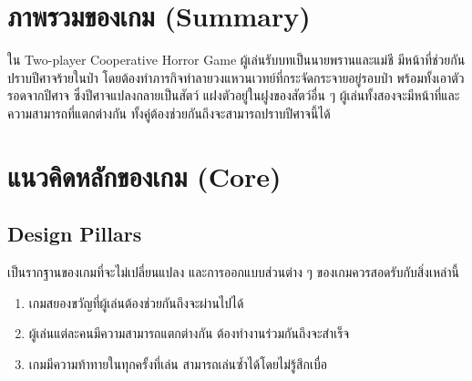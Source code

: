 

\section{ภาพรวมของเกม (Summary)}

ใน Two-player Cooperative Horror Game ผู้เล่นรับบทเป็นนายพรานและแม่ชี มีหน้าที่ช่วยกันปราบปีศาจร้ายในป่า โดยต้องทำภารกิจทำลายวงแหวนเวทย์ที่กระจัดกระจายอยู่รอบป่า พร้อมทั้งเอาตัวรอดจากปีศาจ ซึ่งปีศาจแปลงกลายเป็นสัตว์ แฝงตัวอยู่ในฝูงของสัตว์อื่น ๆ  ผู้เล่นทั้งสองจะมีหน้าที่และความสามารถที่แตกต่างกัน ทั้งคู่ต้องช่วยกันถึงจะสามารถปราบปีศาจนี้ได้

\section{แนวคิดหลักของเกม (Core)}

\subsection{Design Pillars}

เป็นรากฐานของเกมที่จะไม่เปลี่ยนแปลง และการออกแบบส่วนต่าง ๆ ของเกมควรสอดรับกับสิ่งเหล่านี้ \cite{GDD1}

\begin{enumerate}
  \item เกมสยองขวัญที่ผู้เล่นต้องช่วยกันถึงจะผ่านไปได้
  \item ผู้เล่นแต่ละคนมีความสามารถแตกต่างกัน ต้องทำงานร่วมกันถึงจะสำเร็จ
  \item เกมมีความท้าทายในทุกครั้งที่เล่น สามารถเล่นซ้ำได้โดยไม่รู้สึกเบื่อ
\end{enumerate}

